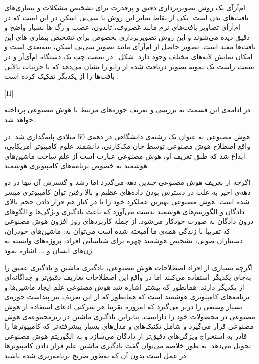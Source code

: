 ام‌آرآی یک روش تصویربرداری دقیق و پرقدرت برای تشخیص مشکلات و بیماری‌های بافت‌های بدن است. یکی از نقاط تمایز این روش با سی‌تی اسکن در این است که در ام‌آرآی تصاویر بافت‌های نرم مانند غضروف، تاندون، عصب و رگ ها بسیار واضح و دقیق دیده می‌شوند و این روش تصویربرداری بخصوص برای تشخیص بیماری های این بافت‌ها مفید است. تصویر حاصل از ام‌آر‌آی مانند تصویر سی‌تی اسکن، سه‌بعدی است و امکان نمایش لایه‌های مختلف وجود دارد. شکل~ در سمت چپ یک دستگاه ام‌آی‌آر و در سمت راست یک نمونه تصویر دریافت شده از زانو را نشان می‌دهد که با جزییات بالایی بافت‌ها را از یکدیگر تفکیک کرده است . 

[H]

در ادامه‌ی این قسمت به بررسی و تعریف حوزه‌های مرتبط با هوش مصنوعی پرداخته خواهد شد.

هوش مصنوعی به عنوان یک رشته‌ی دانشگاهی در دهه‌ی 50 میلادی پایه‌گذاری شد. در واقع اصطلاح هوش مصنوعی توسط جان مک‌کارتی، دانشمند علوم کامپیوتر آمریکایی، ابداع شد که طبق تعریف او، هوش مصنوعی عبارت است از علم ساخت ماشین‌های هوشمند به خصوص برنامه‌های کامپیوتری هوشمند.

اگرچه از تعریف هوش مصنوعی چندین دهه می‌گذرد اما رشد و گسترش آن تنها در دو دهه‌ی اخیر به علت در دسترس بودن داده‌های عظیم و بالا رفتن توان کامپیوتری میسر شده است. هوش مصنوعی بهترین عملکرد خود را با در کنار هم قرار دادن حجم بالای دادگان و الگوریتم‌های هوشمند بدست می‌آورد که باعث یادگیری ویژگی‌ها و الگوهای درون دادگان به صورت خودکار می‌شود. از جمله کاربردهای روز افزون هوش مصنوعی که تقریبا با زندگی همه‌ی ما آمیخته شده است می‌توان به: ماشین‌های خودران، دستیاران صوتی، تشخیص هوشمند چهره برای شناسایی افراد، پروژه‌های وابسته به ژن‌های انسان و ... اشاره نمود.

اگرچه بسیاری از افراد اصطلاحات هوش مصنوعی، یادگیری ماشین و یادگیری عمیق را به‌جای یکدیگر استفاده می‌کنند اما در واقع این اصطلاحات تعاریف دقیق‌تر و جداگانه‌ای از یکدیگر دارند. همانطور که پیشتر اشاره شد هوش مصنوعی علم ایجاد ماشین‌ها و برنامه‌های کامپیوتری هوشمند است که همانطور که از این تعریف نیز پیداست حوزه‌ی بسیار وسیعی را دربر می‌گیرد که امروزه تقریبا هر شرکتی ادعای استفاده از هوش مصنوعی در محصولات خود را داراست. بنابراین یادگیری ماشین در زیرمجموعه‌ی هوش مصنوعی قرار می‌گیرد و شامل تکنیک‌های و مدل‌های بسیار پیشرفته‌تر که کامپیوترها را قادر به استخراج ویژگی‌های دقیق‌تر از دادگان می‌سازد و به الگوریتم هوش مصنوعی تحویل می‌دهد. به طور خلاصه می‌توان گفت یادگیری ماشین علم قرار دادن کامپیوترها در عمل است بدون آن که به‌طور صریح برنامه‌ریزی شده باشند.

